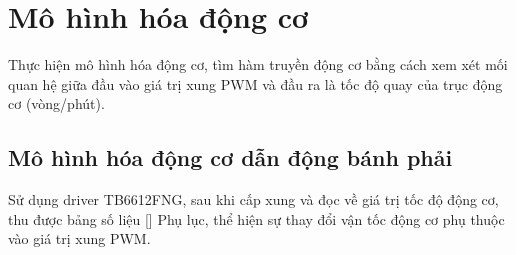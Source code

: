      \section{Mô hình hóa động cơ}
          \hspace*{0.6cm}Thực hiện mô hình hóa động cơ, tìm hàm truyền động cơ bằng cách xem xét mối quan hệ giữa đầu vào giá trị xung PWM và đầu ra là tốc độ quay của trục động cơ (vòng/phút).   
          \subsection{Mô hình hóa động cơ dẫn động bánh phải}    
               \hspace*{0.6cm}Sử dụng driver TB6612FNG, sau khi cấp xung và đọc về giá trị tốc độ động cơ, thu được bảng số liệu [] Phụ lục, thể hiện sự thay đổi vận tốc động cơ phụ thuộc vào giá trị xung PWM.
